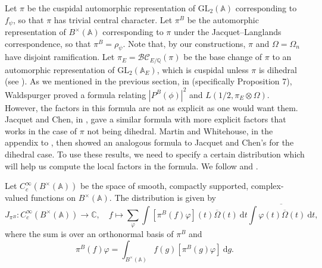 \documentclass[11pt]{amsart}
\newcommand{\Q}{\mathbb{Q}}
\newcommand{\C}{\mathbb{C}}
\newcommand{\A}{\mathbb{A}}
\newcommand{\GL}{\mathrm{GL}}
\theoremstyle{definition}
\theoremstyle{remark}
\begin{document}
Let $\pi$ be the cuspidal automorphic representation of $\GL_2(\A)$ corresponding to $f_{\psi}$, so that $\pi$ has trivial central character. Let $\pi^{B}$ be the automorphic representation of $B^{\times}(\A)$ corresponding to $\pi$ under the Jacquet--Langlands correspondence, so that $\pi^B = \rho_{\psi}$. Note that, by our constructions, $\pi$ and $\Omega = \Omega_n$ have disjoint ramification. Let $\pi_E = \mathcal{BC}_{E/\Q}(\pi)$ be the base change of $\pi$ to an automorphic representation of $\GL_2(\A_{E})$, which is cuspidal unless $\pi$ is dihedral (see \cite[Lemma 11.3, Prop. 11.4]{LanglandsBaseChangeGL2}). As we mentioned in the previous section, in \cite{WaldspurgerFormula} (specifically Proposition 7), Waldspurger proved a formula relating $|P^{B}(\phi)|^2$ and $L(1/2, \pi_E\otimes \Omega)$. However, the factors in this formula are not as explicit as one would want them. Jacquet and Chen, in \cite[\S 6, Thm. 2]{JacChen}, gave a similar formula with more explicit factors that works in the case of $\pi$ not being dihedral. Martin and Whitehouse, in the appendix to \cite{MartinWhitehouse}, then showed an analogous formula to Jacquet and Chen's for the dihedral case. To use these results, we need to specify a certain distribution which will help us compute the local factors in the formula. We follow \cite{Magee} and \cite{JacChen}.

Let $C_{c}^{\infty}(B^{\times}(\A))$ be the space of smooth, compactly supported, complex-valued functions on $B^{\times}(\A)$. The distribution is given by 
\begin{equation}
    J_{\pi^B} : C_{c}^{\infty}(B^{\times}(\A)) \rightarrow \C, \quad f\mapsto \sum_{\varphi} \int [\pi^{B}(f)\varphi](t) \overline{\Omega}(t) \: \mathrm{d}t \overline{\int \varphi(t) \overline{\Omega}(t) \: \mathrm{d}t}, \label{DefDistribution}
\end{equation}
where the sum is over an orthonormal basis of $\pi^{B}$ and $$ \pi^{B}(f)\varphi = \int_{B^{\times}(\A)} f(g) [\pi^B(g)\varphi]\: \mathrm{d}g.$$
\end{document}
